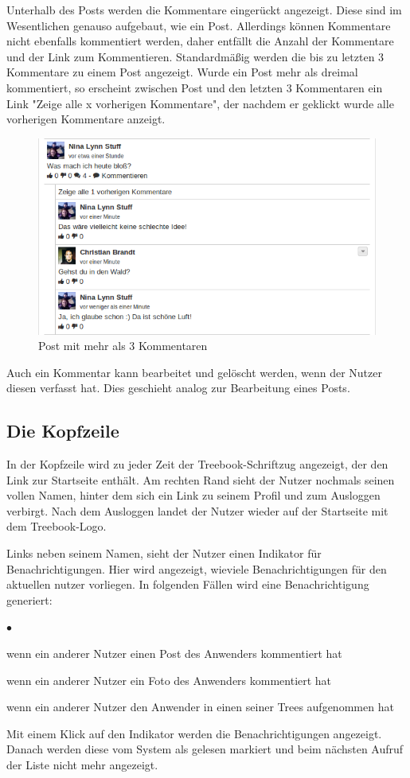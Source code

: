 \documentclass[10pt,a4paper]{book}
\makeatletter
\def\ScaleIfNeeded{%
\ifdim\Gin@nat@width>\linewidth
\linewidth
\else
\Gin@nat@width
\fi
}
\makeatother
\begin{document}
Unterhalb des Posts werden die Kommentare eingerückt angezeigt. Diese sind im Wesentlichen genauso aufgebaut, wie ein Post. Allerdings können Kommentare nicht ebenfalls kommentiert werden, daher entfällt die Anzahl der Kommentare und der Link zum Kommentieren.
Standardmäßig werden die bis zu letzten 3 Kommentare zu einem Post angezeigt. Wurde ein Post mehr als dreimal kommentiert, so erscheint zwischen Post und den letzten 3 Kommentaren ein Link "Zeige alle x vorherigen Kommentare", der nachdem er geklickt wurde alle vorherigen Kommentare anzeigt.
\begin{figure}[htbp]
\centering
\includegraphics[width=\ScaleIfNeeded]{Pictures/screen_post_and_comments.png}%
\caption{Post mit mehr als 3 Kommentaren}%
\end{figure}
Auch ein Kommentar kann bearbeitet und gelöscht werden, wenn der Nutzer diesen verfasst hat. Dies geschieht analog zur Bearbeitung eines Posts.

\subsection{Die Kopfzeile}
In der Kopfzeile wird zu jeder Zeit der Treebook-Schriftzug angezeigt, der den Link zur Startseite enthält. Am rechten Rand sieht der Nutzer nochmals seinen vollen Namen, hinter dem sich ein Link zu seinem Profil und zum Ausloggen verbirgt.
Nach dem Ausloggen landet der Nutzer wieder auf der Startseite mit dem Treebook-Logo.

Links neben seinem Namen, sieht der Nutzer einen Indikator für Benachrichtigungen. Hier wird angezeigt, wieviele Benachrichtigungen für den aktuellen nutzer vorliegen. In folgenden Fällen wird eine Benachrichtigung generiert:
\begin{list}{$\bullet$}{}
\item wenn ein anderer Nutzer einen Post des Anwenders kommentiert hat
\item wenn ein anderer Nutzer ein Foto des Anwenders kommentiert hat
\item wenn ein anderer Nutzer den Anwender in einen seiner Trees aufgenommen hat
\end{list}
Mit einem Klick auf den Indikator werden die Benachrichtigungen angezeigt. Danach werden diese vom System als gelesen markiert und beim nächsten Aufruf der Liste nicht mehr angezeigt.
\end{document}
